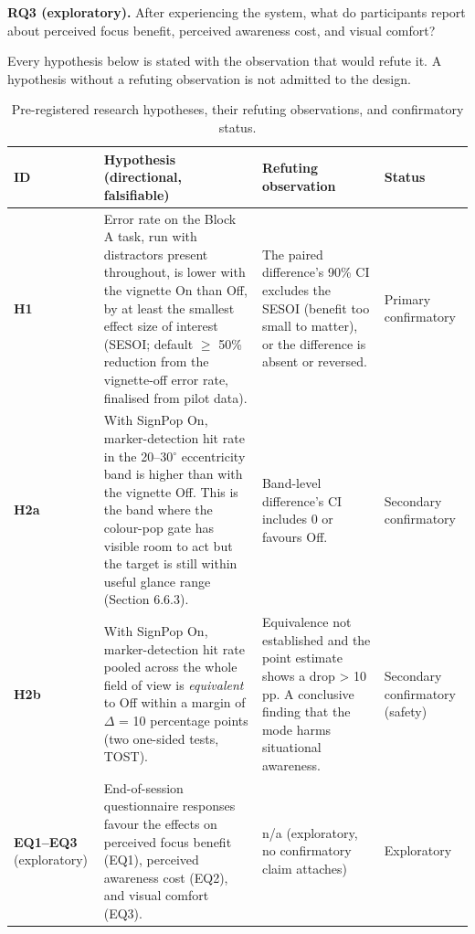 \textbf{RQ3 (exploratory).} After experiencing the system, what do participants report about perceived
focus benefit, perceived awareness cost, and visual comfort?

Every hypothesis below is stated with the observation that would refute it. A hypothesis without a
refuting observation is not admitted to the design.

\begin{longtable}{p{}|p{}|p{}|p{}}
\caption{Pre-registered research hypotheses, their refuting observations, and confirmatory status.}\\
\hline
\textbf{ID} & \textbf{Hypothesis (directional, falsifiable)} & \textbf{Refuting observation} & \textbf{Status} \\
\hline
\endhead
\hline
\textbf{H1} & Error rate on the Block A task, run with distractors present throughout, is lower with the vignette On than Off, by at least the smallest effect size of interest (SESOI; default $\geq$ 50\% reduction from the vignette-off error rate, finalised from pilot data). & The paired difference's 90\% CI excludes the SESOI (benefit too small to matter), or the difference is absent or reversed. & Primary confirmatory \\
\textbf{H2a} & With SignPop On, marker-detection hit rate in the 20–30$^{\circ}$ eccentricity band is higher than with the vignette Off. This is the band where the colour-pop gate has visible room to act but the target is still within useful glance range (Section 6.6.3). & Band-level difference's CI includes 0 or favours Off. & Secondary confirmatory \\
\textbf{H2b} & With SignPop On, marker-detection hit rate pooled across the whole field of view is \textit{equivalent} to Off within a margin of $\Delta$ = 10 percentage points (two one-sided tests, TOST). & Equivalence not established and the point estimate shows a drop > 10 pp. A conclusive finding that the mode harms situational awareness. & Secondary confirmatory (safety) \\
\textbf{EQ1–EQ3} (exploratory) & End-of-session questionnaire responses favour the effects on perceived focus benefit (EQ1), perceived awareness cost (EQ2), and visual comfort (EQ3). & n/a (exploratory, no confirmatory claim attaches) & Exploratory \\
\hline
\end{longtable}

